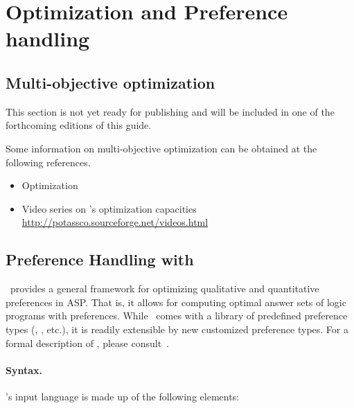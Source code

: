 
\section{Optimization and Preference handling}
\label{sec:prefopt}

\subsection{Multi-objective optimization}
\label{sec:oprimization}

This section is not yet ready for publishing
and will be included in one of the forthcoming editions of this guide.

Some information on multi-objective optimization
can be obtained at the following references.

\begin{itemize}
\item Optimization \cite{gekakasc11b,gekakasc11c,gekasc11b,ankamasc12a}
\item Video series on \clasp's optimization capacities \url{http://potassco.sourceforge.net/videos.html}
\end{itemize}

\subsection{Preference Handling with \asprin}\label{sec:asprin}
\asprin\ provides a general framework for optimizing qualitative and quantitative preferences in ASP.
That is, it allows for computing optimal answer sets of logic programs with preferences.
While \asprin\ comes with a library of predefined preference types 
(, , etc.),
it is readily extensible by new customized preference types.
For a formal description of \asprin, please consult~\cite{brderosc15a}. 



\paragraph{Syntax.}
\asprin's input language is made up of the following elements: 

